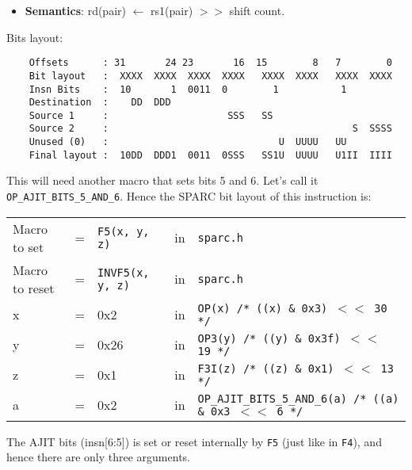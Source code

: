 \begin{enumerate}
\begin{enumerate}
\begin{itemize}
{        DestReg}''. \\
      (\textbf{Note:} In an assembly language program, when the second
      argument is a number, we have direct mode.  A register number is
      prefixed with  ``r'', and hence the  syntax itself distinguished
      between   direct  and   register   indirect   version  of   this
      instruction.)
    \item []\textbf{Semantics}: rd(pair) $\leftarrow$ rs1(pair) $>>$
      shift count.
    \end{itemize}
    Bits layout:
\begin{verbatim}
    Offsets      : 31       24 23       16  15        8   7        0
    Bit layout   :  XXXX  XXXX  XXXX  XXXX   XXXX  XXXX   XXXX  XXXX
    Insn Bits    :  10       1  0011  0        1           1        
    Destination  :    DD  DDD                                       
    Source 1     :                     SSS   SS
    Source 2     :                                           S  SSSS
    Unused (0)   :                              U  UUUU   UU        
    Final layout :  10DD  DDD1  0011  0SSS   SS1U  UUUU   U1II  IIII
\end{verbatim}

    This will need another macro that sets bits 5 and 6. Let's call it
    \texttt{OP\_AJIT\_BITS\_5\_AND\_6}.   Hence the  SPARC bit  layout of  this
    instruction is:

    \begin{tabular}[h]{lclcl}
      Macro to set  &=& \texttt{F5(x, y, z)} &in& \texttt{sparc.h}     \\
      Macro to reset  &=& \texttt{INVF5(x, y, z)} &in& \texttt{sparc.h}     \\
      x &=& 0x2      &in& \texttt{OP(x)  /* ((x) \& 0x3)  $<<$ 30 */} \\
      y &=& 0x26     &in& \texttt{OP3(y) /* ((y) \& 0x3f) $<<$ 19 */} \\
      z &=& 0x1      &in& \texttt{F3I(z) /* ((z) \& 0x1)  $<<$ 13 */} \\
      a &=& 0x2      &in& \texttt{OP\_AJIT\_BITS\_5\_AND\_6(a) /* ((a) \& 0x3  $<<$ 6 */}
    \end{tabular}

    The AJIT bits (insn[6:5]) is  set or reset internally by \texttt{F5}
    (just  like  in  \texttt{F4}),  and   hence  there  are  only  three
    arguments.
    

\end{enumerate}
\end{enumerate}
